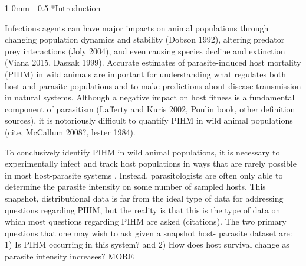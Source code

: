 \documentclass[12pt, a4paper]{article}
\makeatletter
\renewcommand{\section}{\@startsection
{section}%
{1}%
{0mm}%
{-\baselineskip}%
{0.5\baselineskip}%
{\normalfont\bf\large}} %
\makeatother
\begin{document}
\doublespacing

\linenumbers
\section*{Introduction}

Infectious agents can have major impacts on animal populations through changing
population dynamics and stability (Dobson 1992), altering predator prey
interactions (Joly 2004), and even causing species decline and extinction
(Viana 2015, Daszak 1999).  Accurate estimates of parasite-induced host
mortality (PIHM) in wild animals are important for understanding what regulates both
host and parasite populations and to make predictions about disease
transmission in natural systems. Although a negative impact on host fitness is
a fundamental component of parasitism (Lafferty and Kuris 2002, Poulin book,
other definition sources), it is notoriously difficult to quantify PIHM in wild animal populations (cite, McCallum 2008?, lester
1984).

To conclusively identify PIHM in wild animal populations, it is necessary to
experimentally infect and track host populations in ways that are rarely
possible in most host-parasite systems \citep{McCallum2000a}.  Instead, parasitologists
are often only able to determine the parasite intensity on some number of sampled hosts.  This snapshot, distributional data is far from the
ideal type of data for addressing questions regarding PIHM, but the reality is
that this is the type of data on which most questions regarding PIHM are asked
(citations). The two primary questions that one may wish to ask given a snapshot host-
parasite dataset are: 1) Is PIHM occurring in this system? and 2) How does
host survival change as parasite intensity increases?  MORE
\end{document}
